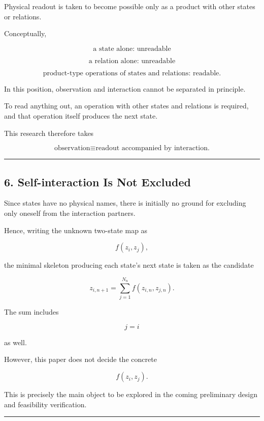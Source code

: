 \documentclass[
  a4paper,
]{article}
\begin{document}
Physical readout is taken to become possible only as a product with
other states or relations.

Conceptually,

\[
\boxed{
\text{a state alone: unreadable}
}
\]

\[
\boxed{
\text{a relation alone: unreadable}
}
\]

\[
\boxed{
\text{product-type operations of states and relations: readable.}
}
\]

In this position, observation and interaction cannot be separated in
principle.

To read anything out, an operation with other states and relations is
required, and that operation itself produces the next state.

This research therefore takes

\[
\boxed{
\text{observation}\equiv\text{readout accompanied by interaction.}
}
\]

\begin{center}\rule{0.5\linewidth}{0.5pt}\end{center}

\subsection{6. Self-interaction Is Not
Excluded}\label{self-interaction-is-not-excluded}

Since states have no physical names, there is initially no ground for
excluding only oneself from the interaction partners.

Hence, writing the unknown two-state map as

\[
f(z_i,z_j),
\]

the minimal skeleton producing each state's next state is taken as the
candidate

\[
\boxed{
 z_{i,n+1}
 =
 \sum_{j=1}^{N_n} f(z_{i,n},z_{j,n}).
}
\]

The sum includes

\[
j=i
\]

as well.

However, this paper does not decide the concrete

\[
f(z_i,z_j).
\]

This is precisely the main object to be explored in the coming
preliminary design and feasibility verification.

\begin{center}\rule{0.5\linewidth}{0.5pt}\end{center}
\end{document}

